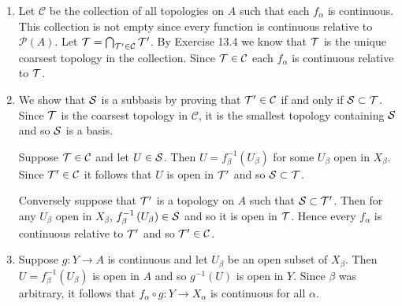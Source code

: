 \begin{sol}
    ${}$
    \begin{enumerate}
        \item Let $\mathcal{C}$ be the collection of all topologies on $A$ such that each $f_\alpha$ is 
        continuous.
            This collection is not empty since every function is continuous relative to $\mathcal{P}(A)$. 
            Let $\mathcal{T}=\bigcap_{\mathcal{T}'\in\mathcal{C}}\mathcal{T}'$.
            By Exercise 13.4 we know that $\mathcal{T}$ is the unique coarsest topology in the collection. 
            Since $\mathcal{T}\in\mathcal{C}$ each $f_\alpha$ is continuous relative to $\mathcal{T}$.
        \item We show that $\mathcal{S}$ is a subbasis by proving that $\mathcal{T}'\in\mathcal{C}$ if and only if 
        $\mathcal{S}\subset\mathcal{T}$. Since $\mathcal{T}$ is the coarsest topology in $\mathcal{C}$, it is the smallest topology containing $\mathcal{S}$ and so $\mathcal{S}$ is a basis.
        
        Suppose $\mathcal{T}\in\mathcal{C}$ and let $U\in\mathcal{S}$. Then $U=f^{-1}_\beta\left(U_\beta\right)$ 
        for some $U_\beta$ open in $X_\beta$. Since $\mathcal{T}'\in\mathcal{C}$ it follows that $U$ is open 
        in $\mathcal{T}'$ and so $\mathcal{S}\subset\mathcal{T}$.

        Conversely suppose that $\mathcal{T}'$ is a topology on $A$ such that $\mathcal{S}\subset\mathcal{T}'$. Then for any 
        $U_\beta$ open in $X_\beta$, $f^{-1}_\beta\left(U_\beta\right)\in\mathcal{S}$ and so it is open in $\mathcal{T}$.
        Hence every $f_\alpha$ is continuous relative to $\mathcal{T}'$ and so $\mathcal{T}'\in\mathcal{C}$.
        \item Suppose $g:Y\to A$ is continuous and let $U_\beta$ be an open subset of $X_\beta$. 
        Then $U=f^{-1}_\beta\left(U_\beta\right)$ is open in $A$ and so $g^{-1}(U)$ is open in $Y$. 
        Since $\beta$ was arbitrary, it follows that $f_\alpha\circ g:Y\to X_\alpha$ is continuous 
        for all $\alpha$.


\end{enumerate}
\end{sol}
